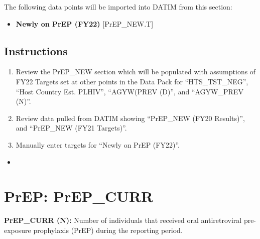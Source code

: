 \documentclass[
  openany]{book}
\providecommand{\tightlist}{%
  \setlength{\itemsep}{0pt}\setlength{\parskip}{0pt}}
\begin{document}
The following data points will be imported into DATIM from this section:

\begin{itemize}
\tightlist
\item
  \textbf{Newly on PrEP (FY22)} {[}PrEP\_NEW.T{]}
\end{itemize}

\hypertarget{instructions-41}{%
\subsection{Instructions}\label{instructions-41}}

\begin{enumerate}
\def\labelenumi{\arabic{enumi}.}
\item
  Review the PrEP\_NEW section which will be populated with assumptions
  of FY22 Targets set at other points in the Data Pack for
  ``HTS\_TST\_NEG'', ``Host Country Est. PLHIV'', ``AGYW(PREV (D)'', and
  ``AGYW\_PREV (N)''.
\item
  Review data pulled from DATIM showing ``PrEP\_NEW (FY20 Results)'', and
  ``PrEP\_NEW (FY21 Targets)''.
\item
  Manually enter targets for ``Newly on PrEP (FY22)''.
\end{enumerate}

\begin{itemize}
\tightlist
\item
\end{itemize}

\hypertarget{prep-prep_curr}{%
\section{PrEP: PrEP\_CURR}\label{prep-prep_curr}}

\textbf{PrEP\_CURR (N):} Number of individuals that received oral
antiretroviral pre-exposure prophylaxis (PrEP) during the reporting
period.
\end{document}
